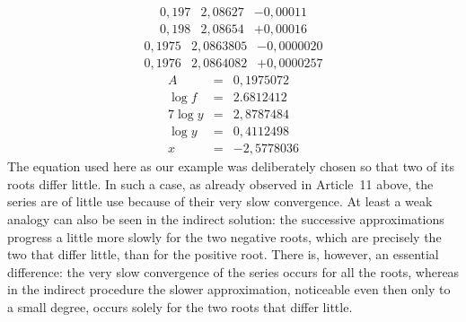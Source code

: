 \[
\begin{array}{r|r|r}
0{,}197&2{,}08627&-0{,}00011\\
0{,}198&2{,}08654&+0{,}00016
\end{array}
\]
\[
\begin{array}{r|r|r}
0{,}1975&2{,}0863805&-0{,}0000020\\
0{,}1976&2{,}0864082&+0{,}0000257
\end{array}
\]
\[
\begin{array}{rcl}
A&=&0{,}1975072\\
\log f&=&2.6812412\\\hline
7\log y&=&2{,}8787484\\
\log y&=&0{,}4112498\\
x&=&-2{,}5778036
\end{array}
\]
The equation used here as our example was deliberately chosen so that two of its roots differ little. In such a case, as already observed in Article\ 11 above, the series are of little use because of their very slow convergence. At least a weak analogy can also be seen in the indirect solution: the successive approximations progress a little more slowly for the two negative roots, which are precisely the two that differ little, than for the positive root. There is, however, an essential difference: the very slow convergence of the series occurs for all the roots, whereas in the indirect procedure the slower approximation, noticeable even then only to a small degree, occurs solely for the two roots that differ little.

